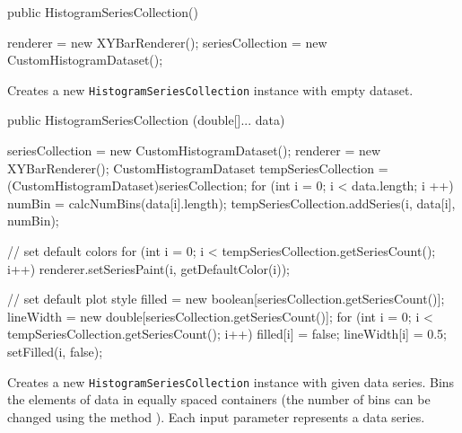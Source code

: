 \begin{code}
   public HistogramSeriesCollection() \begin{hide} {
      renderer = new XYBarRenderer();
      seriesCollection = new CustomHistogramDataset();
   }\end{hide}
\end{code}
\begin{tabb}
   Creates a new \texttt{HistogramSeriesCollection} instance with empty dataset.
\end{tabb}
\begin{code}

   public HistogramSeriesCollection (double[]... data) \begin{hide} {
      seriesCollection = new CustomHistogramDataset();
      renderer = new XYBarRenderer();
      CustomHistogramDataset tempSeriesCollection =
             (CustomHistogramDataset)seriesCollection;
      for (int i = 0; i < data.length; i ++) {
         numBin = calcNumBins(data[i].length);
         tempSeriesCollection.addSeries(i, data[i], numBin);
      }

      // set default colors
      for (int i = 0; i < tempSeriesCollection.getSeriesCount(); i++) {
         renderer.setSeriesPaint(i, getDefaultColor(i));
      }

      // set default plot style
      filled = new boolean[seriesCollection.getSeriesCount()];
      lineWidth = new double[seriesCollection.getSeriesCount()];
      for (int i = 0; i < tempSeriesCollection.getSeriesCount(); i++) {
         filled[i] = false;
         lineWidth[i] = 0.5;
         setFilled(i, false);
      }
   }\end{hide}
\end{code}
\begin{tabb}
   Creates a new \texttt{HistogramSeriesCollection} instance with given data series.
   Bins the elements of data in equally spaced containers (the number of bins
   can be changed using the method ).
   Each input parameter %
   represents a data series.
\end{tabb}
\begin{htmlonly}
\end{htmlonly}
